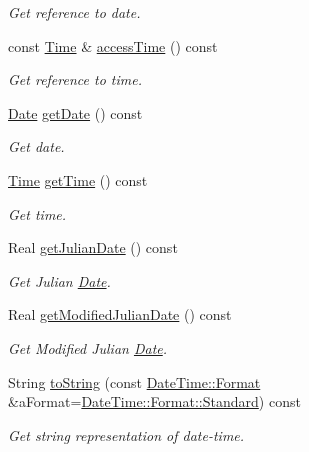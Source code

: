 \begin{DoxyCompactItemize}
\begin{DoxyCompactList}\small\item\em Get reference to date. \end{DoxyCompactList}\item 
const \hyperlink{classostk_1_1physics_1_1time_1_1_time}{Time} \& \hyperlink{classostk_1_1physics_1_1time_1_1_date_time_a263c05ca06cee6b535e3da6783184bee}{access\+Time} () const
\begin{DoxyCompactList}\small\item\em Get reference to time. \end{DoxyCompactList}\item 
\hyperlink{classostk_1_1physics_1_1time_1_1_date}{Date} \hyperlink{classostk_1_1physics_1_1time_1_1_date_time_aafd979e2eb7095ee7bc8bb3e9a1b52ae}{get\+Date} () const
\begin{DoxyCompactList}\small\item\em Get date. \end{DoxyCompactList}\item 
\hyperlink{classostk_1_1physics_1_1time_1_1_time}{Time} \hyperlink{classostk_1_1physics_1_1time_1_1_date_time_ae1460f38a9e41c5c7e42874de571d9f9}{get\+Time} () const
\begin{DoxyCompactList}\small\item\em Get time. \end{DoxyCompactList}\item 
Real \hyperlink{classostk_1_1physics_1_1time_1_1_date_time_a067835c455394e18072d654455ac89cb}{get\+Julian\+Date} () const
\begin{DoxyCompactList}\small\item\em Get Julian \hyperlink{classostk_1_1physics_1_1time_1_1_date}{Date}. \end{DoxyCompactList}\item 
Real \hyperlink{classostk_1_1physics_1_1time_1_1_date_time_a8f2ca8f9d2a8e1828c8f92827e1803ca}{get\+Modified\+Julian\+Date} () const
\begin{DoxyCompactList}\small\item\em Get Modified Julian \hyperlink{classostk_1_1physics_1_1time_1_1_date}{Date}. \end{DoxyCompactList}\item 
String \hyperlink{classostk_1_1physics_1_1time_1_1_date_time_a693b5b08de1352b5c6120290629bcb26}{to\+String} (const \hyperlink{classostk_1_1physics_1_1time_1_1_date_time_a1d21d982b18bf56ed684fcf1cd97e092}{Date\+Time\+::\+Format} \&a\+Format=\hyperlink{classostk_1_1physics_1_1time_1_1_date_time_a1d21d982b18bf56ed684fcf1cd97e092aeb6d8ae6f20283755b339c0dc273988b}{Date\+Time\+::\+Format\+::\+Standard}) const
\begin{DoxyCompactList}\small\item\em Get string representation of date-\/time. \end{DoxyCompactList}\end{DoxyCompactItemize}
